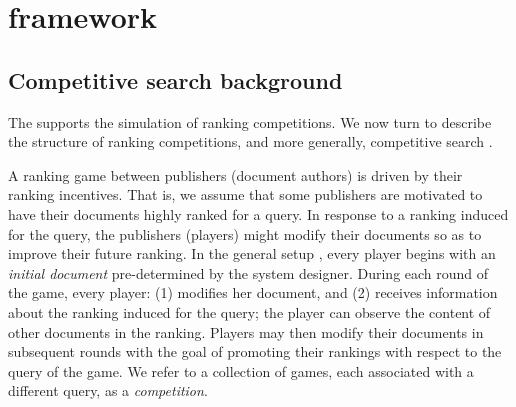 \section{{\platformName} framework}
\subsection{Competitive search background}\label{sec_background}
The \platformName \platform supports the simulation of ranking competitions. We now turn to describe the structure of ranking competitions, and more generally, competitive search \cite{kurland_competitive_2022}.

A ranking game between publishers (document authors) is driven by their ranking incentives. That is, we assume that some publishers are motivated to have their documents highly ranked for a query. In response to a ranking induced for the query, the publishers (players) might modify their documents so as to improve their future ranking. In the general setup \cite{raifer_information_2017}, every player begins with an \textit{initial document} pre-determined by the system designer. During each round of the game, every player: (1) modifies her document, and (2) receives information about the ranking induced for the query; the player can observe the content of other documents in the ranking. Players may then modify their documents in subsequent rounds with the goal of promoting their rankings with respect to the query of the game. We refer to a collection of games, each associated with a different query, as a {\em competition}.




